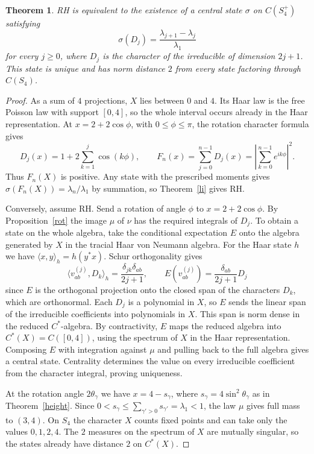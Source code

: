\documentclass[11pt,a4paper]{article}
\newtheorem{thm}{Theorem}[section]
\begin{document}
\begin{samepage}
\begin{thm}\label{four-points}
RH is equivalent to the existence of a central state $\sigma$ on $C(S_4^+)$ satisfying
\[
 \sigma(D_j)=\frac{\lambda_{j+1}-\lambda_j}{\lambda_1}
\]
for every $j\geq0$, where $D_j$ is the character of the irreducible of dimension $2j+1$. This state is unique and has norm distance $2$ from every state factoring through $C(S_4)$.
\end{thm}
\end{samepage}
\begin{proof}
As a sum of $4$ projections, $X$ lies between $0$ and $4$. Its Haar law is the free Poisson law with support $[0,4]$, so the whole interval occurs already in the Haar representation. At $x=2+2\cos\phi$, with $0\leq\phi\leq\pi$, the rotation character formula gives
\[
 D_j(x)=1+2\sum_{k=1}^j\cos(k\phi),\qquad
 F_n(x)=\sum_{j=0}^{n-1}D_j(x)=\left|\sum_{k=0}^{n-1}e^{ik\phi}\right|^2 .
\]
Thus $F_n(X)$ is positive. Any state with the prescribed moments gives $\sigma(F_n(X))=\lambda_n/\lambda_1$ by summation, so Theorem~\ref{li} gives RH.

Conversely, assume RH. Send a rotation of angle $\phi$ to $x=2+2\cos\phi$. By Proposition~\ref{rot} the image $\mu$ of $\nu$ has the required integrals of $D_j$. To obtain a state on the whole algebra, take the conditional expectation $E$ onto the algebra generated by $X$ in the tracial Haar von Neumann algebra. For the Haar state $h$ we have $\langle x,y\rangle_h=h(y^*x)$. Schur orthogonality gives
\[
 \langle v^{(j)}_{ab},D_k\rangle_h=\frac{\delta_{jk}\delta_{ab}}{2j+1},
 \qquad E(v^{(j)}_{ab})=\frac{\delta_{ab}}{2j+1}D_j
\]
since $E$ is the orthogonal projection onto the closed span of the characters $D_k$, which are orthonormal. Each $D_j$ is a polynomial in $X$, so $E$ sends the linear span of the irreducible coefficients into polynomials in $X$. This span is norm dense in the reduced $C^*$-algebra. By contractivity, $E$ maps the reduced algebra into $C^*(X)=C([0,4])$, using the spectrum of $X$ in the Haar representation. Composing $E$ with integration against $\mu$ and pulling back to the full algebra gives a central state. Centrality determines the value on every irreducible coefficient from the character integral, proving uniqueness.

At the rotation angle $2\theta_\gamma$ we have $x=4-s_\gamma$, where $s_\gamma=4\sin^2\theta_\gamma$ as in Theorem~\ref{height}. Since $0<s_\gamma\leq\sum_{\gamma'>0}s_{\gamma'}=\lambda_1<1$, the law $\mu$ gives full mass to $(3,4)$. On $S_4$ the character $X$ counts fixed points and can take only the values $0,1,2,4$. The $2$ measures on the spectrum of $X$ are mutually singular, so the states already have distance $2$ on $C^*(X)$.
\end{proof}
\end{document}
